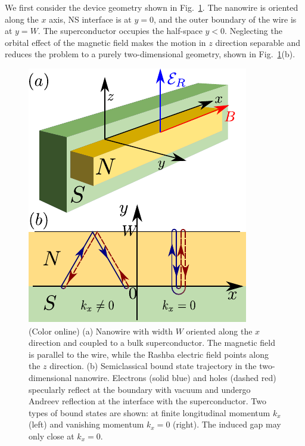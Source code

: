 We first consider the device geometry shown in Fig.~\ref{fig:1stmodel}.
The nanowire is oriented along the $x$ axis, NS interface is at $y=0$, and the outer boundary of the wire is at $y=W$.
The superconductor occupies the half-space $y<0$.
Neglecting the orbital effect of the magnetic field makes the motion in $z$ direction separable and reduces the problem to a purely two-dimensional geometry, shown in Fig.~\ref{fig:1stmodel}(b).

\begin{figure}[t]
\includegraphics[width=0.8\columnwidth]{chapter_shortjunction/figures/3d.pdf}
\caption{(Color online) (a) Nanowire with width $W$ oriented along the $x$ direction and coupled to a bulk superconductor.
The magnetic field is parallel to the wire, while the Rashba electric field points along the $z$ direction.
(b) Semiclassical bound state trajectory in the two-dimensional nanowire. Electrons (solid blue) and holes (dashed red) specularly reflect at the boundary with vacuum and undergo Andreev reflection at the interface with the superconductor.
Two types of bound states are shown: at finite longitudinal momentum $k_x$ (left) and vanishing momentum $k_x=0$ (right).
The induced gap may only close at $k_x = 0$.}
\label{fig:1stmodel}
\end{figure}

